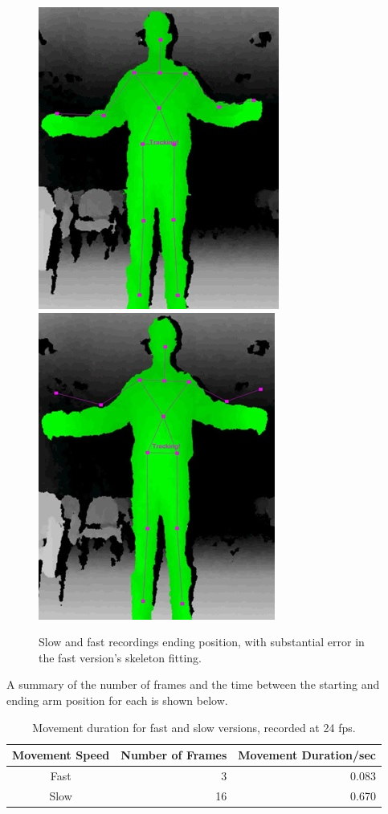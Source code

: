 \documentclass[10pt]{article}
\begin{document}
\begin{figure}
\center
\includegraphics[scale=0.5]{SlowEnd.jpg} \includegraphics[scale=0.5]{FastEnd.jpg}
\caption{Slow and fast recordings ending position, with substantial error in the fast version's skeleton fitting.}
\end{figure}


\noindent A summary of the number of frames and the time between the starting and ending arm position for each  is shown below.

\begin{table}[H]
\center
\begin{tabular}{| c | r | r |}
\hline
Movement Speed & Number of Frames & Movement Duration/sec\\
\hline
Fast & 3 & 0.083\\
Slow & 16 & 0.670\\
\hline
\end{tabular}
\caption{Movement duration for fast and slow versions, recorded at 24 fps.}
\end{table}
\end{document}
